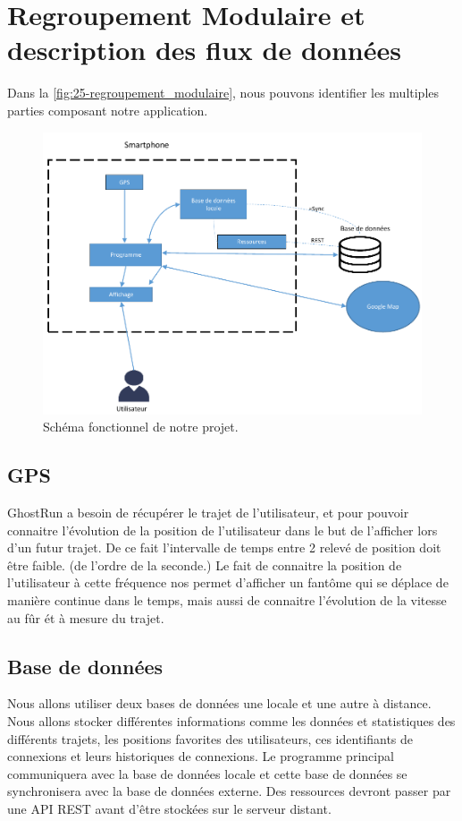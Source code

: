 \chapter{Regroupement Modulaire et description des flux de données}

Dans la \autoref{fig:25-regroupement_modulaire}, nous pouvons identifier les multiples parties composant notre application.

\begin{figure}[h]
    \centering
    \includegraphics[keepaspectratio, width=2\textwidth/2, height=2\textheight/5]{ima/regroupement_modulaire}
    \caption{Schéma fonctionnel de notre projet.}
    \label{fig:25-regroupement_modulaire}
\end{figure}

\section{GPS}
GhostRun a besoin de récupérer le trajet de l'utilisateur, et pour pouvoir connaitre l'évolution de la position de l'utilisateur
dans le but de l'afficher lors d'un futur trajet. De ce fait l'intervalle de temps entre 2 relevé de position doit être faible.
(de l'ordre de la seconde.)
Le fait de connaitre la position de l'utilisateur à cette fréquence nos permet d'afficher un fantôme qui se déplace de manière continue dans le temps,
mais aussi de connaitre l'évolution de la vitesse au fûr ét à mesure du trajet.


\section{Base de données}
Nous allons utiliser deux bases de données une locale et une autre à distance. Nous allons stocker différentes informations comme les données et statistiques des différents trajets, les positions favorites des utilisateurs, ces identifiants de connexions et leurs historiques de connexions.
Le programme principal communiquera avec la base de données locale et cette base de données se synchronisera avec la base de données externe. Des ressources devront passer par une \gls{API} \gls{REST} avant d’être stockées sur le serveur distant.


